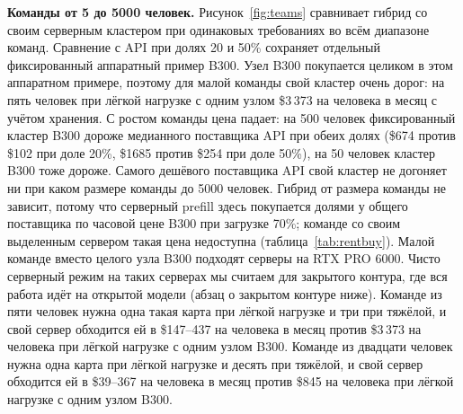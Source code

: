 \textbf{Команды от 5 до 5000 человек.} Рисунок~\ref{fig:teams} сравнивает гибрид со своим серверным кластером при одинаковых требованиях во всём диапазоне команд.
Сравнение с API при долях 20 и 50\% сохраняет отдельный фиксированный аппаратный пример B300. Узел
B300 покупается целиком в этом аппаратном примере, поэтому для малой команды свой кластер очень дорог: на пять человек при лёгкой нагрузке с одним узлом \$3\,373 на человека в
месяц с учётом хранения. С ростом команды цена падает: на 500 человек фиксированный кластер B300 дороже медианного поставщика API при обеих долях
(\$674 против \$102 при доле 20\%, \$1685 против \$254 при доле 50\%), на 50 человек кластер B300 тоже дороже. Самого дешёвого
поставщика API свой кластер не догоняет ни при каком размере команды до 5000 человек. Гибрид от размера команды не зависит, потому что серверный prefill здесь покупается долями у общего поставщика по
часовой цене B300 при загрузке 70\%; команде со своим выделенным сервером такая цена недоступна
(таблица~\ref{tab:rentbuy}). Малой команде вместо целого узла B300 подходят
серверы на RTX PRO 6000. Чисто серверный режим на таких серверах мы считаем для закрытого контура, где вся работа идёт на
открытой модели (абзац о закрытом контуре ниже). Команде из пяти человек нужна одна такая карта при лёгкой нагрузке и три при тяжёлой, и свой сервер обходится ей в \$147--437 на человека в месяц против \$3\,373 на человека при лёгкой нагрузке с одним узлом B300.
Команде из двадцати человек нужна одна карта при лёгкой нагрузке и десять при тяжёлой, и свой
сервер обходится ей в \$39--367 на человека в месяц против \$845 на человека при лёгкой нагрузке с одним узлом B300.

